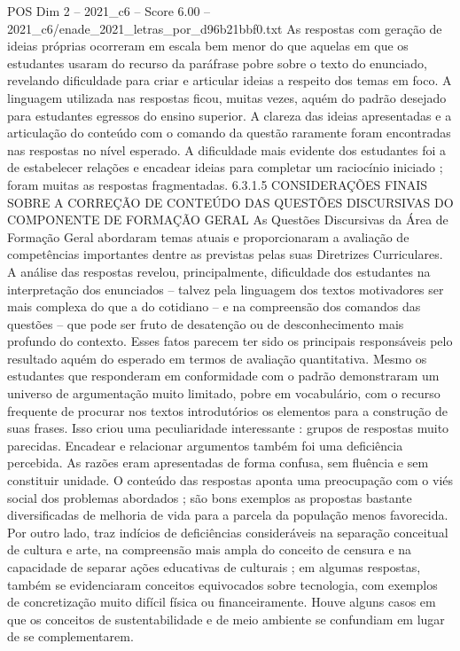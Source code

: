 \begin{textsample}{POS Dim 2 – 2021\_c6 – Score 6.00 – 2021\_c6/enade\_2021\_letras\_por\_d96b21bbf0.txt}
As respostas com geração de ideias próprias ocorreram em escala bem menor do que aquelas em que os estudantes usaram do recurso da paráfrase pobre sobre o texto do enunciado, revelando dificuldade para criar e articular ideias a respeito dos temas em foco.
A linguagem utilizada nas respostas ficou, muitas vezes, aquém do padrão desejado para estudantes egressos do ensino superior.
A clareza das ideias apresentadas e a articulação do conteúdo com o comando da questão raramente foram encontradas nas respostas no nível esperado.
A dificuldade mais evidente dos estudantes foi a de estabelecer relações e encadear ideias para completar um raciocínio iniciado ; foram muitas as respostas fragmentadas. 6.3.1.5 CONSIDERAÇÕES FINAIS SOBRE A CORREÇÃO DE CONTEÚDO DAS QUESTÕES DISCURSIVAS DO COMPONENTE DE FORMAÇÃO GERAL As Questões Discursivas da Área de Formação Geral abordaram temas atuais e proporcionaram a avaliação de competências importantes dentre as previstas pelas suas Diretrizes Curriculares.
A análise das respostas revelou, principalmente, dificuldade dos estudantes na interpretação dos enunciados – talvez pela linguagem dos textos motivadores ser mais complexa do que a do cotidiano – e na compreensão dos comandos das questões – que pode ser fruto de desatenção ou de desconhecimento mais profundo do contexto.
Esses fatos parecem ter sido os principais responsáveis pelo resultado aquém do esperado em termos de avaliação quantitativa.
Mesmo os estudantes que responderam em conformidade com o padrão demonstraram um universo de argumentação muito limitado, pobre em vocabulário, com o recurso frequente de procurar nos textos introdutórios os elementos para a construção de suas frases.
Isso criou uma peculiaridade interessante : grupos de respostas muito parecidas.
Encadear e relacionar argumentos também foi uma deficiência percebida.
As razões eram apresentadas de forma confusa, sem fluência e sem constituir unidade.
O conteúdo das respostas aponta uma preocupação com o viés social dos problemas abordados ; são bons exemplos as propostas bastante diversificadas de melhoria de vida para a parcela da população menos favorecida.
Por outro lado, traz indícios de deficiências consideráveis na separação conceitual de cultura e arte, na compreensão mais ampla do conceito de censura e na capacidade de separar ações educativas de culturais ; em algumas respostas, também se evidenciaram conceitos equivocados sobre tecnologia, com exemplos de concretização muito difícil física ou financeiramente.
Houve alguns casos em que os conceitos de sustentabilidade e de meio ambiente se confundiam em lugar de se complementarem.

\end{textsample}
